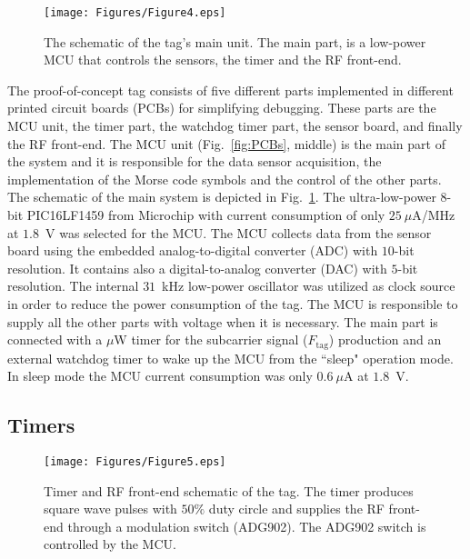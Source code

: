 \documentclass[journal]{IEEEtran}
\begin{document}
	
\begin{figure}[t]
\centering
\texttt{[image: Figures/Figure4.eps]}
\caption{The schematic of the tag's main unit. The main part, is a low-power MCU that controls the sensors, the timer and the RF front-end.}
\label{fig:main_unit}
\end{figure}

The proof-of-concept tag consists of five different parts  implemented in  different printed circuit boards (PCBs) for simplifying debugging. 
%
These parts are the MCU unit, the timer part, the watchdog timer part, the sensor board, and finally the RF front-end. 
%
The MCU unit (Fig.~\ref{fig:PCBs}, middle) is the main part of the system and it is responsible for the data sensor acquisition, the implementation of the Morse code symbols and the control of the other parts. 
%
The schematic of the main system is depicted in Fig.~\ref{fig:main_unit}.
%
The ultra-low-power $8$-bit PIC16LF1459  from Microchip with current consumption  of only $25~\mu$A/MHz at $1.8$~V \cite{PIC16LF1459} was selected for the MCU.
%
The MCU collects data from the sensor board using the embedded analog-to-digital converter (ADC) with $10$-bit resolution.
%
It contains also a digital-to-analog converter (DAC) with $5$-bit resolution.     
%
The internal $31$~kHz low-power  oscillator was utilized as clock source in order to reduce the  power consumption of the tag.
The  MCU is responsible to supply  all the other parts with  voltage when  it is necessary.
%
The main part is connected with a $\mu$W timer for the subcarrier signal ($F_\text{tag}$) production 
and an external watchdog timer to wake up the MCU from the ``sleep" operation mode. 
%
In sleep mode the MCU  current consumption was only $0.6~\mu$A at  $1.8$~V.
%

\subsection{Timers}
\label{subsec:Timers}

\begin{figure}[t]
\centering
\texttt{[image: Figures/Figure5.eps]}
\caption{Timer and  RF front-end schematic of the tag. The timer produces  square wave pulses with $50\%$ duty circle and supplies the RF front-end through a modulation switch (ADG902). The ADG902 switch is controlled by the MCU.}
\label{fig:timer}
\end{figure}
\end{document}
